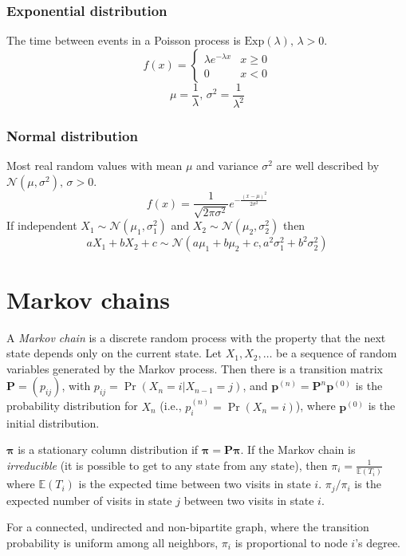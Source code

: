 \subsubsection{Exponential distribution}
The time between events in a Poisson process is $\textrm{Exp}(\lambda),\,\lambda>0$.
\[f(x) = \left\{
\begin{array}{cl}
\lambda e^{-\lambda x} & x\geq0\\
0 & x<0
\end{array}\right.\]
\[\mu=\frac{1}{\lambda},\,\sigma^2=\frac{1}{\lambda^2}\]

\subsubsection{Normal distribution}
Most real random values with mean $\mu$ and variance $\sigma^2$ are well described by $\mathcal{N}(\mu,\sigma^2),\,\sigma>0$.
\[ f(x) = \frac{1}{\sqrt{2\pi\sigma^2}}e^{-\frac{(x-\mu)^2}{2\sigma^2}} \]
If independent $X_1 \sim \mathcal{N}(\mu_1,\sigma_1^2)$ and $X_2 \sim \mathcal{N}(\mu_2,\sigma_2^2)$ then
\[ aX_1 + bX_2 + c \sim \mathcal{N}(a\mu_1+b\mu_2+c,a^2\sigma_1^2+b^2\sigma_2^2) \]

\section{Markov chains}
A \emph{Markov chain} is a discrete random process with the property that the next state depends only on the current state.
Let $X_1,X_2,\ldots$ be a sequence of random variables generated by the Markov process.
Then there is a transition matrix $\mathbf{P} = (p_{ij})$, with $p_{ij} = \Pr(X_n = i | X_{n-1} = j)$,
and $\mathbf{p}^{(n)} = \mathbf P^n \mathbf p^{(0)}$ is the probability distribution for $X_n$ (i.e., $p^{(n)}_i = \Pr(X_n = i)$),
where $\mathbf{p}^{(0)}$ is the initial distribution.

$\mathbf{\pi}$ is a stationary column distribution if $\mathbf{\pi} = \mathbf{P\pi}$.
If the Markov chain is \emph{irreducible} (it is possible to get to any state from any state),
then $\pi_i = \frac{1}{\mathbb{E}(T_i)}$ where $\mathbb{E}(T_i)$  is the expected time between two visits in state $i$.
$\pi_j/\pi_i$ is the expected number of visits in state $j$ between two visits in state $i$.

For a connected, undirected and non-bipartite graph, where the transition probability is uniform among all neighbors, $\pi_i$ is proportional to node $i$'s degree.

